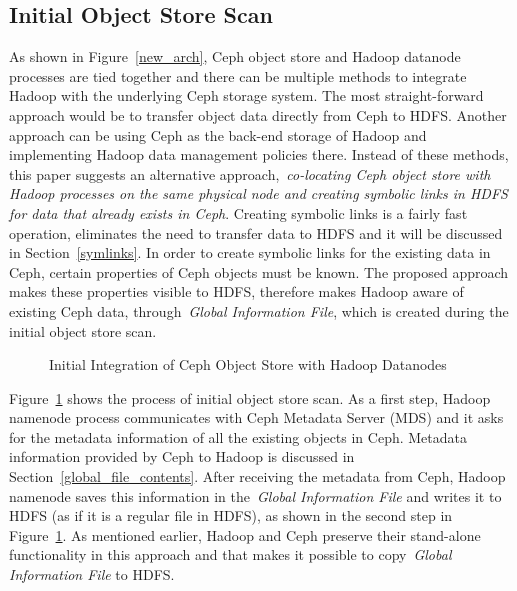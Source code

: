 \subsection{Initial Object Store Scan}
\label{initial_data_scan}
As shown in Figure~\ref{new_arch}, Ceph object store and Hadoop datanode processes are
tied together and there can be multiple methods to integrate Hadoop with the underlying Ceph storage system.
The most straight-forward approach would be to transfer object data directly from Ceph to HDFS.
Another approach can be using Ceph as the back-end storage of Hadoop and implementing
Hadoop data management policies there. Instead of these methods, this paper suggests
an alternative approach,~\textit{co-locating Ceph object store with Hadoop processes
on the same physical node and creating symbolic links in HDFS for data that already exists in
Ceph}. Creating symbolic links is a fairly fast operation, eliminates the need to transfer
data to HDFS and it will be discussed in Section~\ref{symlinks}. In order to create symbolic
links for the existing data in Ceph, certain properties of Ceph objects must be known. The
proposed approach makes these properties visible to HDFS, therefore makes Hadoop aware of
existing Ceph data, through~\textit{Global Information File}, which is created during the initial object store scan.

\begin{figure}[!htbp]
\centering
{}
\caption{Initial Integration of Ceph Object Store with Hadoop Datanodes}
\label{initial_scan}
\end{figure}

Figure~\ref{initial_scan} shows the process of initial object store scan. As a first step,
Hadoop namenode process communicates with Ceph Metadata Server (MDS) and it asks for the metadata
information of all the existing objects in Ceph. Metadata information provided by Ceph
to Hadoop is discussed in Section~\ref{global_file_contents}. After receiving the metadata from Ceph, Hadoop
namenode saves this information in the~\textit{Global Information File} and writes it
to HDFS (as if it is a regular file in HDFS), as shown in the second step in Figure~\ref{initial_scan}.
As mentioned earlier, Hadoop and Ceph preserve their stand-alone functionality in this
approach and that makes it possible to copy~\textit{Global Information File} to HDFS.


